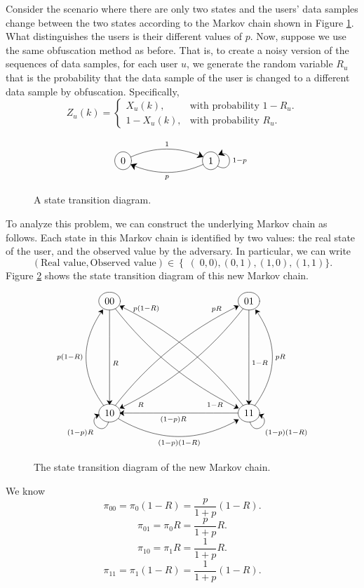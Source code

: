 \begin{example}
Consider the scenario where there are only two states and the users' data samples change between the two states according to the Markov chain shown in Figure \ref{fig:MC-diagram}. What distinguishes the users is their different values of $p$. Now, suppose we use the same obfuscation method as before. That is, to create a noisy version of the sequences of data samples, for each user $u$, we generate the random variable $R_u$ that is the probability that the data sample of the user is changed to a different data sample by obfuscation. Specifically,
\[
{Z}_{u}(k)=\begin{cases}
{X}_{u}(k), & \textrm{with probability } 1-R_u.\\
1-{X}_{u}(k),& \textrm{with probability } R_u.
\end{cases}
\]

\begin{figure}[H]
\begin{center}
\[
\SelectTips {lu}{12 scaled 2500}
\xymatrixcolsep{6pc}\xymatrixrowsep{5pc}\xymatrix{
*++[o][F]{0}  \ar@/^1pc/[r]^{1}
& *++[o][F]{1} \ar@(dr,ur)[]_{1-p}  \ar@/^1pc/[l]^{p}
}
\]
\caption{A state transition diagram.}\label{fig:MC-diagram}
\end{center}
\end{figure}
To analyze this problem, we can construct the underlying Markov chain as follows. Each state in this Markov chain is identified by two values: the real state of the user, and the observed value by the adversary. In particular, we can write
\[\left(\text{Real value}, \text{Observed value}\right) \in \left\{\right(0,0), (0,1), (1,0), (1,1)\}.\]
Figure \ref{fig:MC-diagram2} shows the state transition diagram of this new Markov chain.

\begin{figure}[H]
\begin{center}
\[
\SelectTips {lu}{12 scaled 2000}
\xymatrixcolsep{10pc}\xymatrixrowsep{8pc}\xymatrix{
*++[o][F]{00} \ar@//[d]^{R} \ar@/_1pc/[dr]_>>>>>{1-R}
& *++[o][F]{01} \ar@//[d]^{1-R} \ar@/^1pc/[dl]^>>>>>{R} \\
*++[o][F]{10} \ar@(d,l)[]^{(1-p)R} \ar@/_2pc/[r]_{(1-p)(1-R)} \ar@/^2pc/[u]^{p(1-R)} \ar@/^1pc/[ur]^>>>>>{pR}
& *++[o][F]{11} \ar@(d,r)[]_{(1-p)(1-R)}  \ar@//[l]^{(1-p)R} \ar@/_2pc/[u]_{pR} \ar@/_1pc/[ul]_>>>>>{p(1-R)}
}
\]
\caption{The state transition diagram of the new Markov chain.}\label{fig:MC-diagram2}
\end{center}
\end{figure}
 We know
 \[ \pi_{00}=\pi_0(1-R)=\frac{p}{1+p}(1-R).\]
 \[ \pi_{01}=\pi_0R= \frac{p}{1+p}R.\]
 \[ \pi_{10}=\pi_1R=\frac{1}{1+p}R.\]
 \[ \pi_{11}=\pi_1(1-R)=\frac{1}{1+p}(1-R).\]


\end{example}
